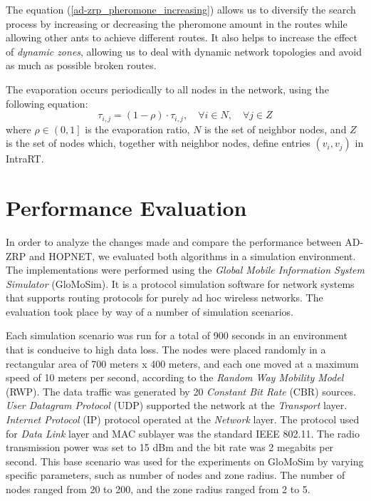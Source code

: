 \documentclass[conference]{IEEEtran}
\begin{document}
The equation (\ref{ad-zrp_pheromone_increasing}) allows us to diversify the search process by increasing or decreasing the pheromone amount in the routes while allowing other ants to achieve different routes.
It also helps to increase the effect of \emph{dynamic zones}, allowing us to deal with dynamic network topologies and avoid as much as possible broken routes.

The evaporation occurs periodically to all nodes in the network, using the following equation:
\begin{equation} \tau _{i,j} = \left ( 1 - \rho \right ) \cdot \tau _{i,j} , \quad \forall i \in N, \quad \forall j \in Z \label{evaporation} \end{equation}
where $\rho \in \left ( 0,1  \right ]$ is the evaporation ratio, $N$ is the set of neighbor nodes, and $Z$ is the set of nodes which, together with neighbor nodes, define entries $\left ( v_{i},v_{j} \right )$ in IntraRT.


\section{Performance Evaluation}
\label{evaluation}

In order to analyze the changes made and compare the performance between AD-ZRP and HOPNET, we evaluated both algorithms in a simulation environment.
The implementations were performed using the \emph{Global Mobile Information System Simulator} (GloMoSim).
It is a protocol simulation software for network systems that supports routing protocols for purely ad hoc wireless networks.
The evaluation took place by way of a number of simulation scenarios.

Each simulation scenario was run for a total of 900 seconds in an environment that is conducive to high data loss.
The nodes were placed randomly in a rectangular area of 700 meters x 400 meters, and each one moved at a maximum speed of 10 meters per second, according to the \emph{Random Way Mobility Model} (RWP).
The data traffic was generated by 20 \emph{Constant Bit Rate} (CBR) sources.
\emph{User Datagram Protocol} (UDP) supported the network at the \emph{Transport} layer.
\emph{Internet Protocol} (IP) protocol operated at the \emph{Network} layer.
The protocol used for \emph{Data Link} layer and MAC sublayer was the standard IEEE 802.11.
The radio transmission power was set to 15 dBm and the bit rate was 2 megabits per second.
This base scenario was used for the experiments on GloMoSim by varying specific parameters, such as number of nodes and zone radius.
The number of nodes ranged from 20 to 200, and the zone radius ranged from 2 to 5.
\end{document}
